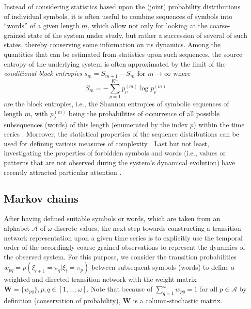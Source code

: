 Instead of considering statistics based upon the (joint) probability distributions of individual symbols, it is often useful to combine sequences of symbols into ``words'' of a given length $m$, which allow not only for looking at the coarse-grained state of the system under study, but rather a succession of several of such states, thereby conserving some information on its dynamics. Among the quantities that can be estimated from statistics upon such sequences, the source entropy of the underlying system is often approximated by the limit of the \textit{conditional block entropies} $s_m=S_{m+1}-S_m$ for $m\to\infty$ where
\begin{equation}
S_m=-\sum_{p=1}^{K^m} p_p^{(m)}\log p_p^{(m)}
\end{equation}
\noindent
are the block entropies, i.e., the Shannon entropies of symbolic sequences of length $m$, with $p_q^{(m)}$ being the probabilities of occurrence of all possible subsequences (words) of this length (enumerated by the index $p$) within the time series \cite{Daw2003,Ebeling1992}. Moreover, the statistical properties of the sequence distributions can be used for defining various measures of complexity \cite{Grassberger1986,Rosso2007}. Last but not least, investigating the properties of forbidden symbols and words (i.e., values or patterns that are not observed during the system's dynamical evolution) have recently attracted particular attention \cite{Amigo2007,Carpi2010}.


\subsection{Markov chains}

After having defined suitable symbols or words, which are taken from an alphabet $\mathcal{A}$ of $\omega$ discrete values, the next step towards constructing a transition network representation upon a given time series is to explicitly use the temporal order of the accordingly coarse-grained observations to represent the dynamics of the observed system. 
For this purpose, we consider the transition probabilities $w_{pq} = p (\xi_{i+1} = \pi_q | \xi_i = \pi_p)$ between subsequent symbols (words) to define a weighted and directed transition network with the weight matrix $\mathbf{W} = \{w_{pq} \}, p,q \in [1, \dots, \omega]$. Note that because of $\sum_{q=1}^{\omega} w_{pq}=1$ for all $p\in\mathcal{A}$ by definition (conservation of probability), $\mathbf{W}$ is a column-stochastic matrix.

